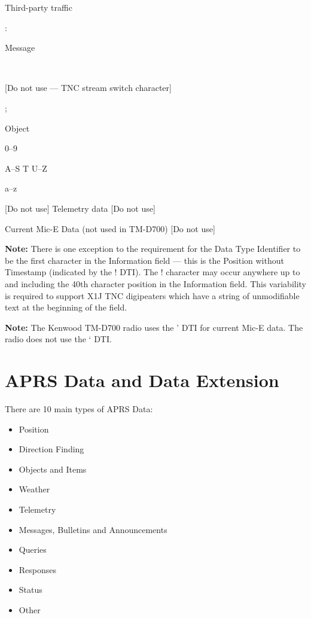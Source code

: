 Third-party traffic

:

Message

~

[Do not use — TNC stream switch character]

;

Object

0–9

A–S
T
U–Z

a–z



[Do not use]
Telemetry data
[Do not use]

Current Mic-E Data (not used in TM-D700)
[Do not use]





\textbf{Note:} There is one exception to the requirement for the Data Type Identifier
to be the first character in the Information field — this is the Position without
Timestamp (indicated by the ! DTI). The ! character may occur anywhere
up to and including the 40th character position in the Information field. This
variability is required to support X1J TNC digipeaters which have a string of
unmodifiable text at the beginning of the field.


\textbf{Note:} The Kenwood TM-D700 radio uses the ' DTI for current Mic-E data.
The radio does not use the ‘ DTI.

\section{APRS Data and Data Extension}



There are 10 main types of APRS Data:

\begin {itemize}

\item Position
\item Direction Finding
\item Objects and Items
\item Weather
\item Telemetry
\item Messages, Bulletins and Announcements
\item Queries
\item Responses
\item Status
\item Other

\end{itemize}


